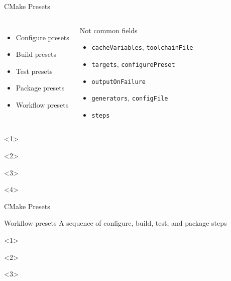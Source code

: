 \documentclass{beamer}
\begin{document}
\begin{frame}[fragile]{CMake Presets}\small%
	\vspace{1cm}
	\begin{columns}
		\begin{itemize}
			\item Configure presets
			\item Build presets
			\item Test presets
			\item Package presets
			\item Workflow presets
		\end{itemize}
		
		\begin{block}{Not common fields}
		\begin{itemize}\footnotesize
			\item \texttt{cacheVariables}, \texttt{toolchainFile}
			\item \texttt{targets}, \texttt{configurePreset}
			\item \texttt{outputOnFailure}
			\item \texttt{generators}, \texttt{configFile}
			\item \texttt{steps}
		\end{itemize}
		\end{block}
	\end{columns}
	\vspace{1cm}
	\begin{onlyenv}
		
	\end{onlyenv}
	\begin{onlyenv}
		
	\end{onlyenv}
	\begin{onlyenv}
		
	\end{onlyenv}
	\begin{onlyenv}
		
	\end{onlyenv}
\end{frame}
\begin{frame}[fragile]{CMake Presets}\small%
	\vspace{1cm}
	\begin{block}{Workflow presets}
		A sequence of configure, build, test, and package steps
	\end{block}
	\vspace{1cm}
	\begin{onlyenv}
		
	\end{onlyenv}
	\begin{onlyenv}
		
	\end{onlyenv}
	\begin{onlyenv}
		
	\end{onlyenv}
\end{frame}
\end{document}
